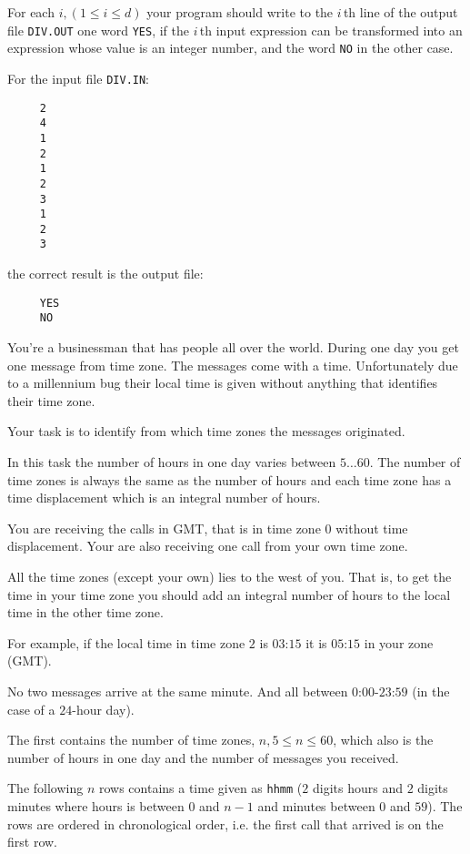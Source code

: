 For each $i,(1\leq i \leq d)$ your program should write to the $i\,$th line of the
output file \verb|DIV.OUT| one word \verb|YES|, if the $i\,$th input expression can be
transformed into an expression whose value is an integer number, and the word
\verb|NO| in the other case.


For the input file \verb|DIV.IN|:
\begin{verbatim}
     2
     4
     1
     2
     1
     2
     3
     1
     2
     3
\end{verbatim}
the correct result is the output file:
\begin{verbatim}
     YES
     NO
\end{verbatim}

\newpage

You're a businessman that has people all over the world. During one day
you get  one message from  time zone. The messages come with a
time. Unfortunately due to a millennium bug their local time is given
without anything that identifies their time zone.

Your task is to identify from which time zones the messages originated.

In this task the number of hours in one day varies between $5 \ldots 60$. The
number of time zones is always the same as the number of hours and each
time zone has a time displacement which is an integral number of hours.

You are receiving the calls in GMT, that is in time zone $0$ without time
displacement. Your are also receiving one call from your own time zone.

All the time zones (except your own) lies to the west of you. That is, to
get the time in your time zone you should add an integral number of hours
to the local time in the other time zone.

For example, if the local time in time zone $2$ is $03$:$15$ it is $05$:$15$ in your
zone (GMT).

No two messages arrive at the same minute. And all between $0$:$00$-$23$:$59$ (in
the case of a $24$-hour day).

The first contains the number of time zones, $n, 5\leq n \leq 60$, which
also is the number of hours in one day and the number of messages you received.

The following $n$ rows contains a time given as \verb|hhmm| ($2$ digits hours
and $2$ digits minutes where hours is between $0$ and $n-1$ and minutes between
$0$ and $59$). The rows are ordered in chronological order, i.e. the first call that
arrived is on the first row.

